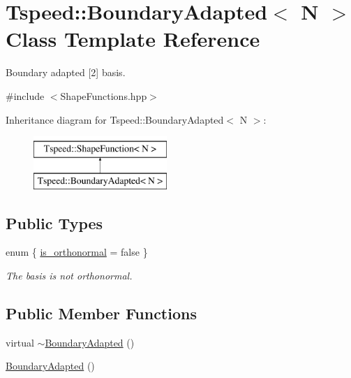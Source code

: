 \hypertarget{classTspeed_1_1BoundaryAdapted}{\section{Tspeed\-:\-:Boundary\-Adapted$<$ N $>$ Class Template Reference}
\label{classTspeed_1_1BoundaryAdapted}
}


Boundary adapted \mbox{[}2\mbox{]} basis.  




{\ttfamily \#include $<$Shape\-Functions.\-hpp$>$}

Inheritance diagram for Tspeed\-:\-:Boundary\-Adapted$<$ N $>$\-:\begin{figure}[H]
\begin{center}
\leavevmode
\includegraphics[height=2.000000cm]{classTspeed_1_1BoundaryAdapted}
\end{center}
\end{figure}
\subsection*{Public Types}
\begin{DoxyCompactItemize}
\item 
enum \{ \hyperlink{classTspeed_1_1BoundaryAdapted_a43bbb02cefcd3061b7b85ee061d0fe21a14fd943d0e78f08196b5f0f9e05232ce}{is\-\_\-orthonormal} = false
 \}
\begin{DoxyCompactList}\small\item\em The basis is not orthonormal. \end{DoxyCompactList}\end{DoxyCompactItemize}
\subsection*{Public Member Functions}
\begin{DoxyCompactItemize}
\item 
virtual \hyperlink{classTspeed_1_1BoundaryAdapted_a0a85bcdf3da9c2a7db73f485fb83aa3f}{$\sim$\-Boundary\-Adapted} ()
\item 
\hyperlink{classTspeed_1_1BoundaryAdapted_a9e2a2066ba91ed177411d9ab0290e706}{Boundary\-Adapted} ()
\end{DoxyCompactItemize}
